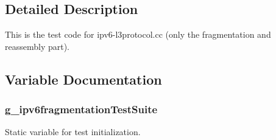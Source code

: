\subsection{Detailed Description}
This is the test code for ipv6-\/l3protocol.\+cc (only the fragmentation and reassembly part). 

\subsection{Variable Documentation}
\subsubsection[{\texorpdfstring{g\+\_\+ipv6fragmentation\+Test\+Suite}{g_ipv6fragmentationTestSuite}}]{ g\+\_\+ipv6fragmentation\+Test\+Suite\hspace{0.3cm}{\ttfamily [static]}}\hypertarget{ipv6-fragmentation-test_8cc_a470dba9e3fce9bb43c90a0306c654f90}{}\label{ipv6-fragmentation-test_8cc_a470dba9e3fce9bb43c90a0306c654f90}


Static variable for test initialization. 

